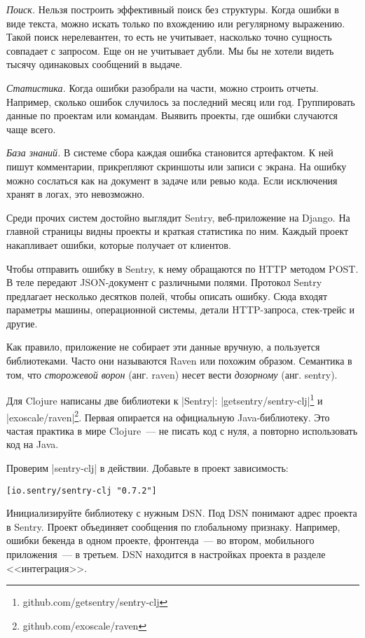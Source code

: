 \emph{Поиск.} Нельзя построить эффективный поиск без структуры. Когда ошибки в
виде текста, можно искать только по вхождению или регулярному выражению. Такой
поиск нерелевантен, то есть не учитывает, насколько точно сущность совпадает с
запросом. Еще он не учитывает дубли. Мы бы не хотели видеть тысячу одинаковых
сообщений в выдаче.

\emph{Статистика.} Когда ошибки разобрали на части, можно строить
отчеты. Например, сколько ошибок случилось за последний месяц или
год. Группировать данные по проектам или командам. Выявить проекты, где ошибки
случаются чаще всего.

\emph{База знаний.} В системе сбора каждая ошибка становится артефактом. К ней
пишут комментарии, прикрепляют скриншоты или записи с экрана. На ошибку можно
сослаться как на документ в задаче или ревью кода. Если исключения хранят в
логах, это невозможно.

Среди прочих систем достойно выглядит Sentry, веб-приложение на Django. На
главной страницы видны проекты и краткая статистика по ним. Каждый проект
накапливает ошибки, которые получает от клиентов.

Чтобы отправить ошибку в Sentry, к нему обращаются по HTTP методом POST. В теле
передают JSON-документ с различными полями. Протокол Sentry предлагает несколько
десятков полей, чтобы описать ошибку. Сюда входят параметры машины, операционной
системы, детали HTTP-запроса, стек-трейс и другие.

Как правило, приложение не собирает эти данные вручную, а пользуется
библиотеками. Часто они называются Raven или похожим образом. Семантика в том,
что \emph{сторожевой ворон} (анг. raven) несет вести \emph{дозорному}
(анг. sentry).

Для Clojure написаны две библиотеки к \spverb|Sentry|:
\spverb|getsentry/sentry-clj|\footnote{github.com/getsentry/sentry-clj} и
\spverb|exoscale/raven|\footnote{github.com/exoscale/raven}. Первая опирается на
официальную Java-библиотеку. Это частая практика в мире Clojure~--- не писать
код с нуля, а повторно использовать код на Java.

Проверим \spverb|sentry-clj| в действии. Добавьте в проект зависимость:

\begin{verbatim}
[io.sentry/sentry-clj "0.7.2"]
\end{verbatim}

Инициализируйте библиотеку с нужным DSN. Под DSN понимают адрес проекта в
Sentry. Проект объединяет сообщения по глобальному признаку. Например, ошибки
бекенда в одном проекте, фронтенда~--- во втором, мобильного приложения~--- в
третьем. DSN находится в настройках проекта в разделе <<интеграция>>.

